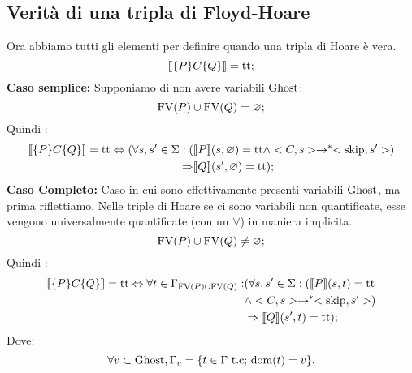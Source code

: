 \subsection{Verità di una tripla di Floyd-Hoare}
Ora abbiamo tutti gli elementi per definire quando una tripla di Hoare è vera.
\[
   \llbracket \{P\}C\{Q\} \rrbracket = \mathrm{tt};
\]
\textbf{Caso semplice: }Supponiamo di non avere variabili $\mathrm{Ghost}$:
\[
   \mathrm{FV}(P) \cup \mathrm{FV}(Q)= \varnothing;
\]
Quindi :
\begin{align*}
   \llbracket \{P\} C\{Q\} \rrbracket 
      = \mathrm{tt} \Leftrightarrow (\forall s,s'\in \Sigma \mathrel{:}(
      &\llbracket P \rrbracket( s,\varnothing) = \mathrm{tt}\land <C,s>\rightarrow ^*<\mathrm{skip},s'>)\\
      \Rightarrow&\llbracket Q \rrbracket(s',\varnothing)=\mathrm{tt});
\end{align*}
\textbf{Caso Completo: }Caso in cui sono effettivamente presenti variabili $\mathrm{Ghost}$, ma prima riflettiamo.
Nelle triple di Hoare se ci sono variabili non quantificate, esse vengono universalmente quantificate (con un $\forall$) in maniera implicita.
\[
   \mathrm{FV}(P) \cup \mathrm{FV}(Q) \neq \varnothing;
\]
Quindi :
\begin{align*}
    \llbracket \{P\} C\{Q\} \rrbracket 
       = \mathrm{tt} \Leftrightarrow \forall t \in \Gamma_{\mathrm{FV}(P)\cup \mathrm{FV}(Q)}\mathrel{:}
       &(\forall  s,s'\in \Sigma\mathrel{:}(\llbracket P \rrbracket(s,t) = \mathrm{tt}\\
       &\land <C,s>\rightarrow ^*<\mathrm{skip},s'>)\\
       &\Rightarrow\llbracket Q \rrbracket(s',t)=\mathrm{tt});
\end{align*}
Dove:
\[
   \forall v \subset \mathrm{Ghost},\Gamma_{v} =\{t \in \Gamma \text{ t.c; $\mathop{\mathrm{dom}}\nolimits(t) = v$\}}.
\]

